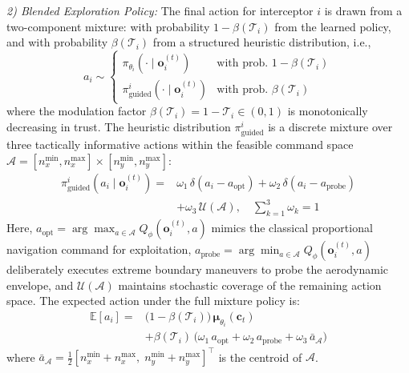 \documentclass[lettersize,journal]{IEEEtran}
\begin{document}
\emph{2) Blended Exploration Policy:} The final action for interceptor $i$ is drawn from a two-component mixture: with probability $1-\beta(\mathcal{T}_i)$ from the learned policy, and with probability $\beta(\mathcal{T}_i)$ from a structured heuristic distribution, i.e.,
\begin{equation}
\label{eq:exploration_policy}
a_i \sim \begin{cases} \pi_{\theta_i}(\cdot \mid \mathbf{o}_i^{(t)}) & \text{with prob. } 1 - \beta(\mathcal{T}_i) \\ \pi_{\mathrm{guided}}^{i}(\cdot \mid \mathbf{o}_i^{(t)}) & \text{with prob. } \beta(\mathcal{T}_i) \end{cases}
\end{equation}
where the modulation factor $\beta(\mathcal{T}_i) = 1 - \mathcal{T}_i \in (0,1)$ is monotonically decreasing in trust. The heuristic distribution $\pi_{\mathrm{guided}}^{i}$ is a discrete mixture over three tactically informative actions within the feasible command space $\mathcal{A} = [n_{x}^{\min}, n_{x}^{\max}] \times [n_{y}^{\min}, n_{y}^{\max}]$:
\begin{equation}
\label{eq:guided}
\begin{split}
\pi_{\mathrm{guided}}^{i}(a_i \mid \mathbf{o}_i^{(t)}) =& \omega_1\,\delta(a_i - a_{\mathrm{opt}}) + \omega_2\,\delta(a_i - a_{\mathrm{probe}}) \\
&+ \omega_3\,\mathcal{U}(\mathcal{A}), \quad \sum_{k=1}^3\omega_k=1
\end{split}
\end{equation}
Here, $a_{\mathrm{opt}} = \arg\max_{a \in \mathcal{A}} Q_\phi(\mathbf{o}_i^{(t)}, a)$ mimics the classical proportional navigation command for exploitation, $a_{\mathrm{probe}} = \arg\min_{a \in \mathcal{A}} Q_\phi(\mathbf{o}_i^{(t)}, a)$ deliberately executes extreme boundary maneuvers to probe the aerodynamic envelope, and $\mathcal{U}(\mathcal{A})$ maintains stochastic coverage of the remaining action space. The expected action under the full mixture policy is:
\begin{equation}
\label{eq:expected_action}
\begin{split}
\mathbb{E}[a_i] =& \bigl(1-\beta(\mathcal{T}_i)\bigr)\,\boldsymbol{\mu}_{\theta_i}(\mathbf{c}_t) \\
&+ \beta(\mathcal{T}_i)\,\bigl(\omega_1\,a_{\mathrm{opt}} + \omega_2\,a_{\mathrm{probe}} + \omega_3\,\bar{a}_{\mathcal{A}}\bigr)
\end{split}
\end{equation}
where $\bar{a}_{\mathcal{A}} = \frac{1}{2}[n_x^{\min}+n_x^{\max},\; n_y^{\min}+n_y^{\max}]^\top$ is the centroid of $\mathcal{A}$.
\end{document}
